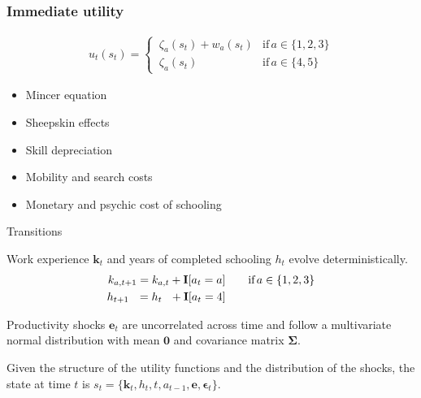 \begin{frame}\frametitle{Immediate utility}\vspace{0.3cm}

  \begin{multicols}{2}

  \begin{align*}
  u_t(s_t) =
  \begin{cases}
      \,\zeta_a(s_t)  + w_a(s_t)   & \text{if}\, a \in \{1, 2, 3\}  \\[0.2cm]
      \,\zeta_a(s_t)                 &  \text{if}\, a \in \{4, 5\}
  \end{cases}
  \end{align*}

  \columnbreak


  \vspace{0.3cm}
  \begin{itemize}\setlength\itemsep{1em}
     \item Mincer equation
     \item Sheepskin effects
     \item Skill depreciation
     \item Mobility and search costs
     \item Monetary and psychic cost of schooling
  \end{itemize}

\end{multicols}

\end{frame}
\begin{frame}{Transitions}\vspace{0.25cm}

  Work experience $\bm{k}_t$  and years of completed schooling $h_t$ evolve deterministically.
  \begin{align*}
  k_{a,t+1} = k_{a,t} + {\textbf{I}}[a_t = a]  &\qquad \text{if}\, a \in \{1, 2, 3\} \\
  h_{t + 1\phantom{,a}} = h_{t\phantom{,a}} +   {\textbf{I}}[a_t = 4]  &\qquad
  \end{align*}

Productivity shocks $\bm{e}_t$ are uncorrelated across time and follow a multivariate normal distribution with mean $\bm{0}$ and covariance matrix $\bm{\Sigma}$.

Given the structure of the utility functions and the distribution of the shocks, the state at time $t$ is $s_t = \{\bm{k}_t, h_t, t, a_{t -1}, \bm{e},\bm{\epsilon}_t\}$.

\end{frame}
